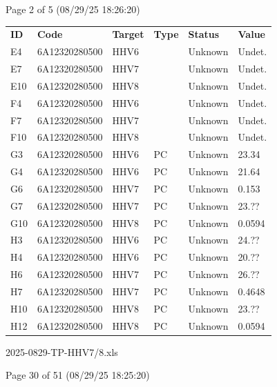 \documentclass[UTF8,10pt,a4paper,fontset=fandol]{ctexart}
\begin{document}
\vfill

\noindent Page 2 of 5 (08/29/25 18:26:20)

\newpage

\begin{center}
\small
\begin{tabular}{@{}llllll@{}}
\textbf{ID} & \textbf{Code} & \textbf{Target} & \textbf{Type} & \textbf{Status} & \textbf{Value} \\
E4  & 6A12320280500 & HHV6 &  & Unknown & Undet. \\
E7  & 6A12320280500 & HHV7 &  & Unknown & Undet. \\
E10 & 6A12320280500 & HHV8 &  & Unknown & Undet. \\
F4  & 6A12320280500 & HHV6 &  & Unknown & Undet. \\
F7  & 6A12320280500 & HHV7 &  & Unknown & Undet. \\
F10 & 6A12320280500 & HHV8 &  & Unknown & Undet. \\
G3  & 6A12320280500 & HHV6 & PC & Unknown & 23.34 \\
G4  & 6A12320280500 & HHV6 & PC & Unknown & 21.64 \\
G6  & 6A12320280500 & HHV7 & PC & Unknown & 0.153 \\
G7  & 6A12320280500 & HHV7 & PC & Unknown & 23.?? \\
G10 & 6A12320280500 & HHV8 & PC & Unknown & 0.0594 \\
H3  & 6A12320280500 & HHV6 & PC & Unknown & 24.?? \\
H4  & 6A12320280500 & HHV6 & PC & Unknown & 20.?? \\
H6  & 6A12320280500 & HHV7 & PC & Unknown & 26.?? \\
H7  & 6A12320280500 & HHV7 & PC & Unknown & 0.4648 \\
H10 & 6A12320280500 & HHV8 & PC & Unknown & 23.?? \\
H12 & 6A12320280500 & HHV8 & PC & Unknown & 0.0594 \\
\end{tabular}
\end{center}

\hfill 2025-0829-TP-HHV7/8.xls

\hfill Page 30 of 51 (08/29/25 18:25:20)
\end{document}
